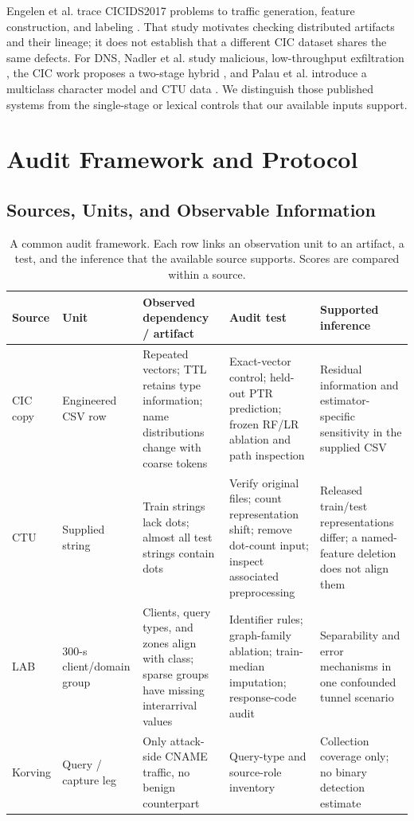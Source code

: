 \documentclass[conference]{IEEEtran}
\begin{document}
Engelen et al. trace CICIDS2017 problems to traffic generation, feature construction, and labeling \cite{engelen}. That study motivates checking distributed artifacts and their lineage; it does not establish that a different CIC dataset shares the same defects. For DNS, Nadler et al. study malicious, low-throughput exfiltration \cite{nadler}, the CIC work proposes a two-stage hybrid \cite{cicpaper}, and Palau et al. introduce a multiclass character model and CTU data \cite{ctupaper,ctudata}. We distinguish those published systems from the single-stage or lexical controls that our available inputs support.

\section{Audit Framework and Protocol}
\subsection{Sources, Units, and Observable Information}
\begin{table}[t]
\caption{A common audit framework. Each row links an observation unit to an artifact, a test, and the inference that the available source supports. Scores are compared within a source.}
\label{tab:framework}
\centering\footnotesize
\begin{tabular}{@{}p{1.05cm}p{1.85cm}p{4.0cm}p{4.35cm}p{4.45cm}@{}}
\toprule
Source & Unit & Observed dependency / artifact & Audit test & Supported inference\\\midrule
CIC copy & Engineered CSV row & Repeated vectors; TTL retains type information; name distributions change with coarse tokens & Exact-vector control; held-out PTR prediction; frozen RF/LR ablation and path inspection & Residual information and estimator-specific sensitivity in the supplied CSV\\
CTU & Supplied string & Train strings lack dots; almost all test strings contain dots & Verify original files; count representation shift; remove dot-count input; inspect associated preprocessing & Released train/test representations differ; a named-feature deletion does not align them\\
LAB & 300-s client/domain group & Clients, query types, and zones align with class; sparse groups have missing interarrival values & Identifier rules; graph-family ablation; train-median imputation; response-code audit & Separability and error mechanisms in one confounded tunnel scenario\\
Korving & Query / capture leg & Only attack-side CNAME traffic, no benign counterpart & Query-type and source-role inventory & Collection coverage only; no binary detection estimate\\
\bottomrule
\end{tabular}
\end{table}
\end{document}
